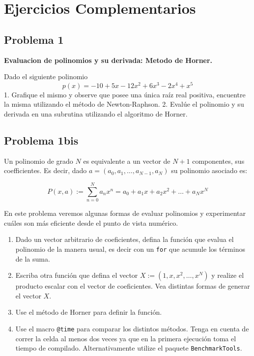 \documentclass[11pt]{article}
\begin{document}
    \hypertarget{ejercicios-complementarios}{%
\section*{Ejercicios Complementarios}\label{ejercicios-complementarios}}

\hypertarget{problema-1}{%
\subsection*{Problema 1}\label{problema-1}}

\textbf{Evaluacion de polinomios y su derivada: Metodo de Horner.}

Dado el siguiente polinomio \[
p(x) = -10 + 5 x - 12 x^2  + 6 x^3  - 2 x^4  + x^5
\] 1. Grafique el mismo y observe que posee una única raíz real
positiva, encuentre la misma utilizando el método de Newton-Raphson. 2.
Evalúe el polinomio y su derivada en una subrutina utilizando el
algoritmo de Horner.

    \hypertarget{problema-1bis}{%
\subsection*{Problema 1bis}\label{problema-1bis}}

Un polinomio de grado \(N\) es equivalente a un vector de \(N+1\)
componentes, sus coefficientes. Es decir, dado
\(a = (a_0,a_1, \ldots, a_{N-1}, a_N)\) su polinomio asociado es:

\[
P(x,a) := \sum_{n=0}^{N} a_n x^n = a_0 + a_1x + a_2x^2 + \ldots + a_Nx^N
\]

En este problema veremos algunas formas de evaluar polinomios y
experimentar cuáles son más eficiente desde el punto de vista numérico.

\begin{enumerate}
\def\labelenumi{\arabic{enumi}.}
\item
  Dado un vector arbitrario de coeficientes, defina la función que
  evalua el polinomio de la manera usual, es decir con un \texttt{for}
  que acumule los términos de la suma.
\item
  Escriba otra función que defina el vector
  \(X := (1,x,x^2, \ldots, x^N)\) y realize el producto escalar con el
  vector de coeficientes. Vea distintas formas de generar el vector
  \(X\).
\item
  Use el método de Horner para definir la función.
\item
  Use el macro \texttt{@time} para comparar los distintos métodos. Tenga
  en cuenta de correr la celda al menos dos veces ya que en la primera
  ejecución toma el tiempo de compilado. Alternativamente utilize el
  paquete \texttt{BenchmarkTools}.
\end{enumerate}
\end{document}
